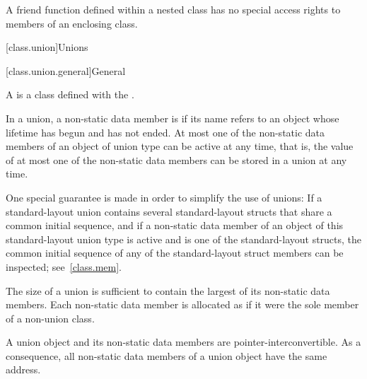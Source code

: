 \pnum
{}%
A friend function defined
within a nested class has no special access rights to
members of an enclosing class.

[class.union]{Unions}%

[class.union.general]{General}%

\pnum
A  is a class defined with the 
.

\pnum
In a union,
a non-static data member is 
if its name refers to an object
whose lifetime has begun and has not ended.
At most one of the non-static data members of an object of union type
can be active at any
time, that is, the value of at most one of the non-static data members can be
stored in a union at any time.
\begin{note}
One special guarantee is made in order to
simplify the use of unions: If a standard-layout union contains several standard-layout
structs that share a common initial sequence, and
if a non-static data member of an object of this standard-layout union type
is active and is one of the standard-layout structs,
the common initial sequence of any of the standard-layout struct members can be inspected;
see~\ref{class.mem}.
\end{note}

\pnum
The size of a union is sufficient to contain the largest
of its non-static data members. Each non-static data member is allocated
as if it were the sole member of a non-union class.
\begin{note}
A union object and its non-static data members are
pointer-interconvertible.
As a consequence, all non-static data members of a
union object have the same address.
\end{note}

